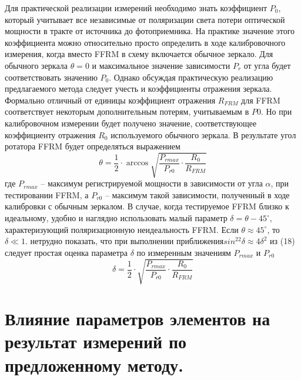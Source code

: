 \documentclass{article}
\begin{document}
Для практической реализации измерений необходимо знать коэффициент $P_0$, который учитывает все независимые от поляризации света потери оптической мощности в тракте от источника до фотоприемника.
На практике значение этого коэффициента можно относительно просто определить в ходе калибровочного измерения, когда вместо FFRM в схему включается обычное зеркало.
Для обычного зеркала $\theta = 0$ и максимальное значение зависимости $P_r$ от угла будет соответствовать значению $P_0$.
Однако обсуждая практическую реализацию предлагаемого метода следует учесть и коэффициенты отражения зеркала.
Формально отличный от единицы коэффициент отражения $R_{FRM}$ для FFRM соответствует некоторым дополнительным потерям, учитываемым в $P0$.
Но при калибровочном измерении будет получено значение, соответствующее коэффициенту отражения $R_0$ используемого обычного зеркала.
В результате угол ротатора FFRM будет определяться выражением
\begin{equation}
    \theta =\frac{1}{2}\cdot\arccos\sqrt{\frac{P_{rmax}}{P_{r0}}\cdot\frac{R_0}{R_{FRM}}}
\end{equation}
где $P_{rmax}$ – максимум регистрируемой мощности в зависимости от угла $\alpha$, при тестировании FFRM, а $P_{r0}$ – максимум такой зависимости, полученный в ходе калибровки с обычным зеркалом.    
В случае, когда тестируемое FFRM близко к идеальному, удобно и наглядно использовать малый параметр $\delta = \theta - 45^\circ$, характеризующий поляризационную неидеальность FFRM.
Если $\theta \approx 45^\circ$, то $ \delta \ll 1$. нетрудно показать, что при выполнении приближения$ sin^22\delta \approx 4\delta^2$ из (18) следует простая оценка параметра $\delta$ по измеренным значениям $P_{rmax}$ и $P_{r0}$
\begin{equation}
    \delta =\frac{1}{2}\cdot\sqrt{\frac{P_{rmax}}{P_{r0}}\cdot\frac{R_0}{R_{FRM}}}
\end{equation}


\section{Влияние параметров элементов на результат измерений по предложенному методу.}
\end{document}
